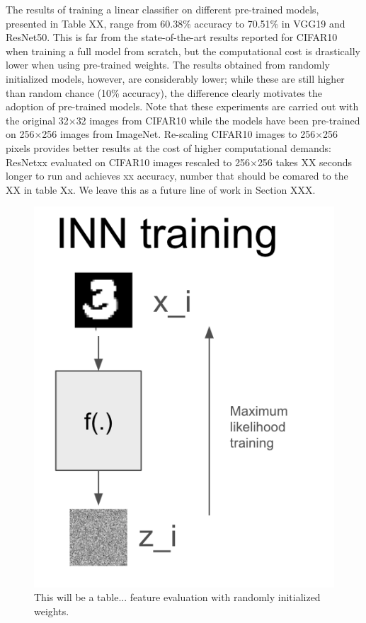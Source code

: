 The results of training a linear classifier on different pre-trained models, presented in Table XX, range from 60.38\% accuracy to 70.51\% in VGG19 and ResNet50. This is far from the state-of-the-art results reported for CIFAR10 when training a full model from scratch, but the computational cost is drastically lower when using pre-trained weights. The results obtained from randomly initialized models, however, are considerably lower; while these are still higher than random chance (10\% accuracy), the difference clearly motivates the adoption of pre-trained models. Note that these experiments are carried out with the original 32$\times$32 images from CIFAR10 while the models have been pre-trained on 256$\times$256 images from ImageNet. Re-scaling CIFAR10 images to 256$\times$256 pixels provides better results at the cost of higher computational demands: ResNetxx evaluated on CIFAR10 images rescaled to 256$\times$256 takes XX seconds longer to run and achieves xx accuracy, number that should be comared to the XX in table Xx. We leave this as a future line of work in Section XXX.

        
\begin{figure}
    \vskip -0.2in 
    \centering

    \includegraphics[width=0.30\columnwidth]{fig_datasynth/inn_train.png}  
            
    \vspace{-2pt}
    \caption{\label{tab:feat_extr_results_randinit} This will be a table... feature evaluation with randomly initialized weights.}
    \vskip -0.0in 
\end{figure}

